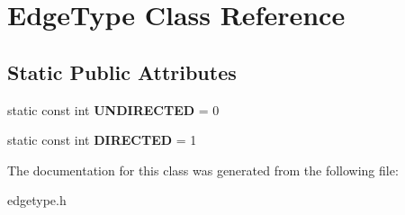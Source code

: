 \hypertarget{class_edge_type}{\section{Edge\-Type Class Reference}
\label{class_edge_type}
}
\subsection*{Static Public Attributes}
\begin{DoxyCompactItemize}
\item 
\hypertarget{class_edge_type_a6533cc56d05c288a550b9980b66c9317}{static const int {\bfseries U\-N\-D\-I\-R\-E\-C\-T\-E\-D} = 0}\label{class_edge_type_a6533cc56d05c288a550b9980b66c9317}

\item 
\hypertarget{class_edge_type_a903017a534f2818c2d17145e4ae0321c}{static const int {\bfseries D\-I\-R\-E\-C\-T\-E\-D} = 1}\label{class_edge_type_a903017a534f2818c2d17145e4ae0321c}

\end{DoxyCompactItemize}


The documentation for this class was generated from the following file\-:\begin{DoxyCompactItemize}
\item 
edgetype.\-h\end{DoxyCompactItemize}
